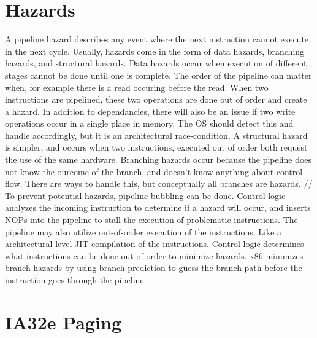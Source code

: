 \documentclass[letterpaper,10pt,titlepage,fleqn]{article}
\begin{document}
\section{Hazards}
    
        A pipeline hazard describes any event where the next instruction cannot execute in the next cycle. 
    Usually, hazards come in the form of data hazards, branching hazards, and structural hazards. Data hazards
    occur when execution of different stages cannot be done until one is complete. The order of the pipeline can 
    matter when, for example there is a read occuring before the read. When two instructions are pipelined, these 
    two operations are done out of order and create a hazard. In addition to dependancies, there will also be an issue
    if two write operations occur in a single place in memory. The OS should detect this and handle accordingly, but 
    it is an architectural race-condition. A structural hazard is simpler, and occurs when two instructions, executed out of order
    both request the use of the same hardware. Branching hazards occur because the pipeline does not know the ourcome of the 
    branch, and doesn't know anything about control flow. There are ways to handle this, but conceptually all branches are hazards. //
    To prevent potential hazards, pipeline bubbling can be done. Control logic analyzes the incoming instruction to determine
    if a hazard will occur, and inserts NOPs into the pipeline to stall the execution of problematic instructions. The pipeline 
    may also utilize out-of-order execution of the instructions. Like a architectural-level JIT compilation of the instructions.
    Control logic determines what instructions can be done out of order to minimize hazards. x86 minimizes branch hazards by using 
    branch prediction to guess the branch path before the instruction goes through the pipeline.\\

\pagebreak

\section{IA32e Paging}
\end{document}
